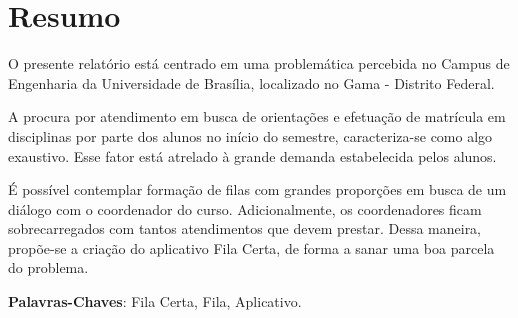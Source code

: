 \chapter[Resumo]{Resumo}
\label{chap:resumo}
	O presente relatório está centrado em uma problemática percebida no Campus de Engenharia da Universidade de Brasília, localizado no Gama - Distrito Federal.

	A procura por atendimento em busca de orientações e efetuação de matrícula em disciplinas por parte dos alunos no início do semestre, caracteriza-se como algo exaustivo. Esse fator está atrelado à grande demanda estabelecida pelos alunos.

	É possível contemplar formação de filas com grandes proporções em busca de um diálogo com o coordenador do curso. Adicionalmente, os coordenadores ficam sobrecarregados com tantos atendimentos que devem prestar. Dessa maneira, propõe-se a criação do aplicativo Fila Certa, de forma a sanar uma boa parcela do problema.

	\vspace{\onelineskip}
	   
	\noindent
	\textbf{Palavras-Chaves}: Fila Certa, Fila, Aplicativo.
